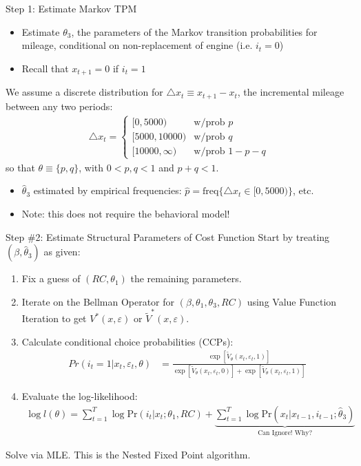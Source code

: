 \documentclass[xcolor=pdftex,dvipsnames,table,mathserif,aspectratio=169]{beamer}
\begin{document}
\begin{frame}{Step 1: Estimate Markov TPM}
\footnotesize
\begin{itemize}
\item Estimate $\theta_3$, the parameters of the Markov transition probabilities for mileage, conditional on non-replacement of engine (i.e. $i_t = 0$)
\item Recall that $x_{t+1} = 0$ if $i_t = 1$
\end{itemize}

We assume a discrete distribution for $\triangle x_t \equiv x_{t+1} - x_t$, the incremental mileage between any two periods:
\begin{align*}
\triangle x_t = \left \{ 
\begin{matrix}
[0, 5000) & \text{w/prob } p \\
[5000, 10000) & \text{w/prob } q \\
[10000, \infty) & \text{w/prob } 1 - p - q  
\end{matrix}
\right .
\end{align*}
so that $\theta \equiv \{p, q \}$, with $0 < p, q< 1$ and $p + q < 1$. \\
\vspace{2mm}
\begin{itemize}
\item $\hat \theta_3$ estimated by empirical frequencies: $\hat p = \text{freq} \{ \triangle x_t \in  [0, 5000) \}$, etc. 
\item Note: this does not require the behavioral model!
\end{itemize}
\end{frame}

\begin{frame}{Step \#2: Estimate Structural Parameters of Cost Function}
\footnotesize
Start by treating $(\beta, \hat \theta_3)$ as given:
\begin{enumerate}
\item Fix a guess of $(RC,\theta_1)$ the remaining parameters. 
\item Iterate on the Bellman Operator for $(\beta,\theta_1,\theta_3,RC)$ using \alert{Value Function Iteration} to get $V^*(x,\varepsilon)$ or $\tilde V^*(x,\varepsilon)$.
\item Calculate \alert{conditional choice probabilities} (CCPs):
\begin{align*}
Pr(i_t=1 | x_t,\varepsilon_t,\theta) &=  \frac {\exp[ \tilde V_{\theta} (x_t, \varepsilon_t, 1)]  }{\exp[\tilde  V_{\theta} (x_t, \varepsilon_t, 0)] + \exp[ \tilde  V_{\theta} (x_t, \varepsilon_t, 1)]} 
\end{align*} 
\item Evaluate the log-likelihood:
\begin{align*}
\log l(\theta) = \sum^T_{t=1} \log \text{Pr} (i_t | x_t ; \theta_1,RC) + \underbrace{\sum^T_{t=1} \log \text{Pr} (x_t | x_{t-1}, i_{t-1}; \hat{\theta}_3)}_{\text{Can Ignore! Why?}}
\end{align*}
\end{enumerate}
Solve via MLE. This is the \alert{Nested Fixed Point} algorithm.
\end{frame}
\end{document}
